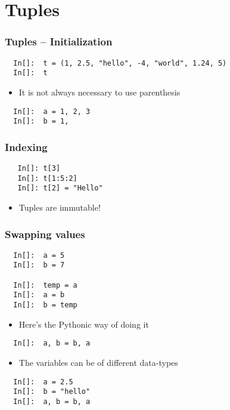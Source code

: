 \section{Tuples}

\begin{frame}[fragile]
  \frametitle{Tuples -- Initialization}
  \begin{lstlisting}
  In[]:  t = (1, 2.5, "hello", -4, "world", 1.24, 5)
  In[]:  t
  \end{lstlisting}
  \begin{itemize}
  \item It is not always necessary to use parenthesis
  \end{itemize}
  \begin{lstlisting}
  In[]:  a = 1, 2, 3 
  In[]:  b = 1, 
  \end{lstlisting}
\end{frame}

\begin{frame}[fragile]
  \frametitle{Indexing}
  \begin{lstlisting}
   In[]: t[3]
   In[]: t[1:5:2]
   In[]: t[2] = "Hello"
  \end{lstlisting}
  \begin{itemize}
  \item \alert{Tuples are immutable!}
  \end{itemize}
\end{frame}

\begin{frame}[fragile]
  \frametitle{Swapping values}
  \begin{lstlisting}
  In[]:  a = 5
  In[]:  b = 7

  In[]:  temp = a
  In[]:  a = b
  In[]:  b = temp
  \end{lstlisting}
  \begin{itemize}
  \item Here's the Pythonic way of doing it
  \end{itemize}
  \begin{lstlisting}
  In[]:  a, b = b, a
  \end{lstlisting}
  \begin{itemize}
  \item The variables can be of different data-types
  \end{itemize}
  \begin{lstlisting}
  In[]:  a = 2.5
  In[]:  b = "hello"
  In[]:  a, b = b, a
  \end{lstlisting}
\end{frame}

